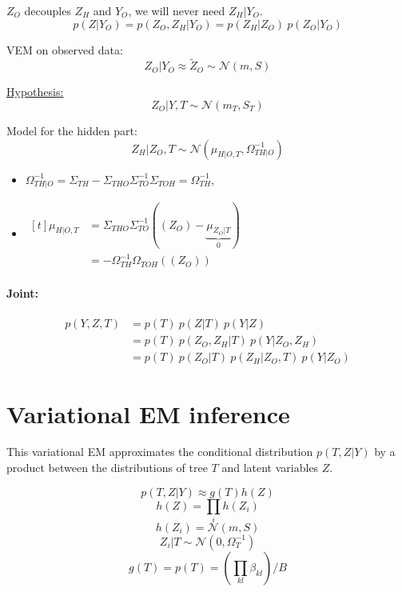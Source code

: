 \documentclass[11pt,a4paper]{article}
\begin{document}
$Z_O$ decouples $Z_H$ and $Y_O$, we will never need $Z_H|Y_O$.
$$ p(Z|Y_O) = p(Z_O,Z_H | Y_O) = p(Z_H|Z_O) \: p(Z_O|Y_O) $$


VEM on observed data: $$Z_O|Y_O \approx \widetilde{Z}_O \sim \mathcal{N}(m,S)$$

\underline{ Hypothesis:}
$$ Z_O|Y,T \sim \mathcal{N}(m_T,S_T)$$

Model for the hidden part: $$Z_H|Z_O,T \sim \mathcal{N}(\mu_{H|O,T}, \Omega_{TH|O}^{-1})$$ 

\begin{itemize}
\item $\Omega_{TH|O}^{-1} = \Sigma_{TH} -\Sigma_{THO}\Sigma_{TO}^{-1}\Sigma_{TOH} = \Omega_{TH}^{-1}$, 

\item$ \displaystyle\begin{aligned}[t]
\mu_{H|O,T} &= \Sigma_{THO}\Sigma_{TO}^{-1}((Z_O)-\underbrace{\mu_{Z_O|T}}_{0}) \\
 &= -\Omega_{TH}^{-1}\Omega_{TOH}((Z_O))
\end{aligned}$\\
\end{itemize}


\paragraph{Joint:}
\begin{align*}
p(Y,Z,T)& = p(T) \: p(Z|T) \: p(Y|Z) \\
&= p(T)\: p(Z_O,Z_H|T) \: p(Y|Z_O,Z_H) \\
&= p(T) \: p(Z_O|T) \: p(Z_H | Z_O,T)  \: p(Y|Z_O)
\end{align*} 
\section{Variational EM inference}

This variational EM approximates the conditional distribution $p(T,Z | Y)$ by a product  between the  distributions of tree $T$ and latent variables $Z$.

$$p(T,Z | Y) \approx  g(T)h(Z)$$
$$ h(Z) = \prod_i h(Z_i)$$
$$ h(Z_i) =  \mathcal{N}(m,S) $$
$$Z_i|T \sim \mathcal{N}(0,\Omega_T^{-1})$$
$$ g(T)=p(T) = \left(\prod_{kl} \beta_{kl} \right) / B$$
\end{document}
